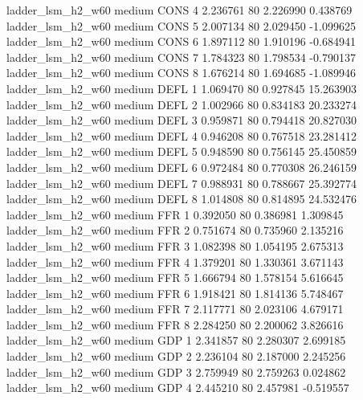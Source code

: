   ladder_lsm_h2_w60     medium     CONS                 4  2.236761 80       2.226990           0.438769
  ladder_lsm_h2_w60     medium     CONS                 5  2.007134 80       2.029450          -1.099625
  ladder_lsm_h2_w60     medium     CONS                 6  1.897112 80       1.910196          -0.684941
  ladder_lsm_h2_w60     medium     CONS                 7  1.784323 80       1.798534          -0.790137
  ladder_lsm_h2_w60     medium     CONS                 8  1.676214 80       1.694685          -1.089946
  ladder_lsm_h2_w60     medium     DEFL                 1  1.069470 80       0.927845          15.263903
  ladder_lsm_h2_w60     medium     DEFL                 2  1.002966 80       0.834183          20.233274
  ladder_lsm_h2_w60     medium     DEFL                 3  0.959871 80       0.794418          20.827030
  ladder_lsm_h2_w60     medium     DEFL                 4  0.946208 80       0.767518          23.281412
  ladder_lsm_h2_w60     medium     DEFL                 5  0.948590 80       0.756145          25.450859
  ladder_lsm_h2_w60     medium     DEFL                 6  0.972484 80       0.770308          26.246159
  ladder_lsm_h2_w60     medium     DEFL                 7  0.988931 80       0.788667          25.392774
  ladder_lsm_h2_w60     medium     DEFL                 8  1.014808 80       0.814895          24.532476
  ladder_lsm_h2_w60     medium      FFR                 1  0.392050 80       0.386981           1.309845
  ladder_lsm_h2_w60     medium      FFR                 2  0.751674 80       0.735960           2.135216
  ladder_lsm_h2_w60     medium      FFR                 3  1.082398 80       1.054195           2.675313
  ladder_lsm_h2_w60     medium      FFR                 4  1.379201 80       1.330361           3.671143
  ladder_lsm_h2_w60     medium      FFR                 5  1.666794 80       1.578154           5.616645
  ladder_lsm_h2_w60     medium      FFR                 6  1.918421 80       1.814136           5.748467
  ladder_lsm_h2_w60     medium      FFR                 7  2.117771 80       2.023106           4.679171
  ladder_lsm_h2_w60     medium      FFR                 8  2.284250 80       2.200062           3.826616
  ladder_lsm_h2_w60     medium      GDP                 1  2.341857 80       2.280307           2.699185
  ladder_lsm_h2_w60     medium      GDP                 2  2.236104 80       2.187000           2.245256
  ladder_lsm_h2_w60     medium      GDP                 3  2.759949 80       2.759263           0.024862
  ladder_lsm_h2_w60     medium      GDP                 4  2.445210 80       2.457981          -0.519557
